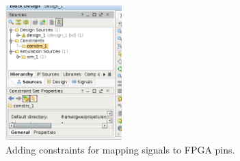 \documentclass[10pt,oneside]{article}
\begin{document}
\begin{figure}[h!tb]
\begin{center}
\includegraphics[width=0.4\textwidth]{addSources}
\end{center}
\caption{Adding constraints for mapping signals to FPGA pins.}
\label{addSources}
\end{figure}

%
%
%
%
%
\end{document}
